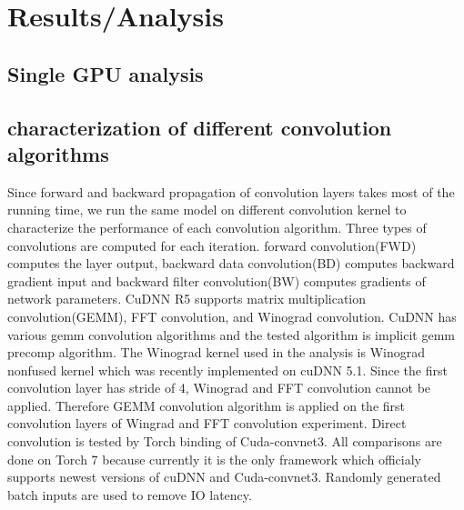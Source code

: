 \section{Results/Analysis}

\subsection{Single GPU analysis}


\subsection{characterization of different convolution algorithms}
Since forward and backward propagation of convolution layers takes most of the running time, we run the same model on different convolution kernel to characterize the performance of each convolution algorithm.
Three types of convolutions are computed for each iteration.
forward convolution(FWD) computes the layer output, backward data convolution(BD) computes backward gradient input and backward filter convolution(BW) computes gradients of network parameters.
CuDNN R5 supports matrix multiplication convolution(GEMM), FFT convolution, and Winograd convolution.
CuDNN has various gemm convolution algorithms and the tested algorithm is implicit gemm precomp algorithm.
The Winograd kernel used in the analysis is Winograd nonfused kernel which was recently implemented  on cuDNN 5.1.
Since the first convolution layer has stride of 4, Winograd and FFT convolution cannot be applied.
Therefore GEMM convolution algorithm is applied on the first convolution layers of Wingrad and FFT convolution experiment.
Direct convolution is tested by Torch binding of Cuda-convnet3.
All comparisons are done on Torch 7 because currently it is the only framework which officialy supports newest versions of cuDNN and Cuda-convnet3.
Randomly generated batch inputs are used to remove IO latency.

